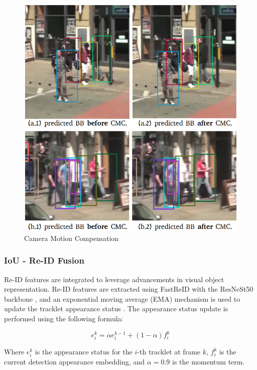 \begin{figure}[H]
  \centering
  \includegraphics[scale=0.33]{gambar/cmc_pred.png}
  \caption{Camera Motion Compensation}
  \label{fig:cmc}
\end{figure}

\vspace{5pt}
\subsubsection{IoU - Re-ID Fusion}
\label{subsubsec:IoU - Re-ID Fusion}

Re-ID features are integrated to leverage advancements in visual object representation. Re-ID features are extracted using FastReID with the ResNeSt50 backbone \cite{he2020fastreid, zhang2020resnest}, and an exponential moving average (EMA) mechanism is used to update the tracklet appearance status \cite{wang2020towards}. The appearance status update is performed using the following formula:

\begin{equation}
e_i^k = \alpha e_i^{k-1} + (1 - \alpha) f_i^k
\end{equation}

Where $e_i^k$ is the appearance status for the $i$-th tracklet at frame $k$, $f_i^k$ is the current detection appearance embedding, and $\alpha=0.9$ is the momentum term.

